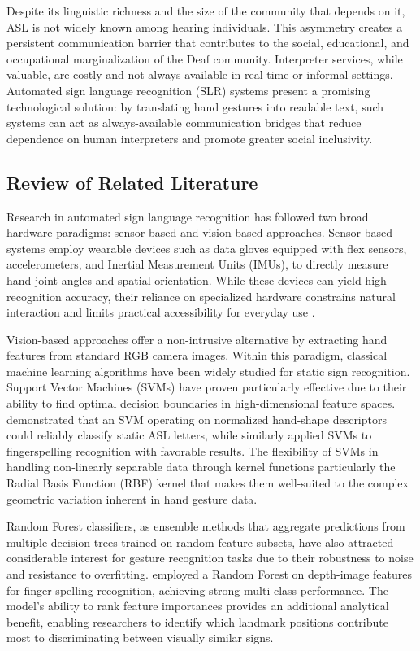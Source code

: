 \documentclass[12pt,runningheads]{llncs}
\begin{document}
Despite its linguistic richness and the size of the community that depends on it, ASL is not widely known among hearing individuals. This asymmetry creates a persistent communication barrier that contributes to the social, educational, and occupational marginalization of the Deaf community. Interpreter services, while valuable, are costly and not always available in real-time or informal settings. Automated sign language recognition (SLR) systems present a promising technological solution: by translating hand gestures into readable text, such systems can act as always-available communication bridges that reduce dependence on human interpreters and promote greater social inclusivity.

\subsection{Review of Related Literature}

Research in automated sign language recognition has followed two broad hardware paradigms: sensor-based and vision-based approaches. Sensor-based systems employ wearable devices such as data gloves equipped with flex sensors, accelerometers, and Inertial Measurement Units (IMUs), to directly measure hand joint angles and spatial orientation. While these devices can yield high recognition accuracy, their reliance on specialized hardware constrains natural interaction and limits practical accessibility for everyday use \cite{oz2011}.

Vision-based approaches offer a non-intrusive alternative by extracting hand features from standard RGB camera images. Within this paradigm, classical machine learning algorithms have been widely studied for static sign recognition. Support Vector Machines (SVMs) have proven particularly effective due to their ability to find optimal decision boundaries in high-dimensional feature spaces. \cite{barczak2011} demonstrated that an SVM operating on normalized hand-shape descriptors could reliably classify static ASL letters, while \cite{isaacs2004} similarly applied SVMs to fingerspelling recognition with favorable results. The flexibility of SVMs in handling non-linearly separable data through kernel functions particularly the Radial Basis Function (RBF) kernel that makes them well-suited to the complex geometric variation inherent in hand gesture data.

Random Forest classifiers, as ensemble methods that aggregate predictions from multiple decision trees trained on random feature subsets, have also attracted considerable interest for gesture recognition tasks due to their robustness to noise and resistance to overfitting. \cite{pugeault2011} employed a Random Forest on depth-image features for finger-spelling recognition, achieving strong multi-class performance. The model's ability to rank feature importances provides an additional analytical benefit, enabling researchers to identify which landmark positions contribute most to discriminating between visually similar signs.
\end{document}
